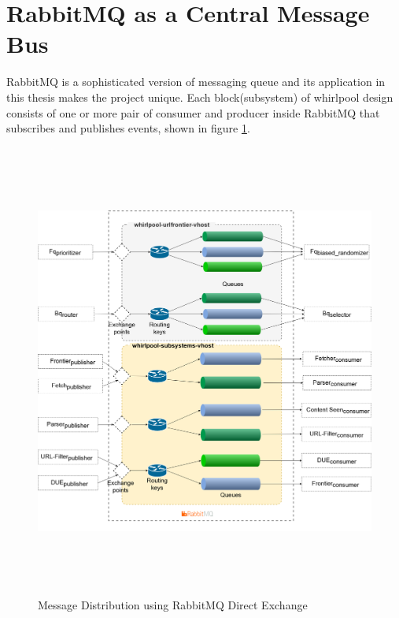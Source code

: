 \section{RabbitMQ as a Central Message Bus}\label{internals}
RabbitMQ is a sophisticated version of messaging queue and its application in this thesis makes the
project unique. Each block(subsystem) of whirlpool design consists of one or more pair of consumer and producer inside RabbitMQ that subscribes and publishes events, shown in figure \ref{fig:rmq}.
\begin{figure}[h!]
  \centering
  \includegraphics[width=20cm,height=15cm,keepaspectratio]{../media/crawler/rmq-broker.png}
  \caption{Message Distribution using RabbitMQ Direct Exchange}
  \label{fig:rmq}
\end{figure}

